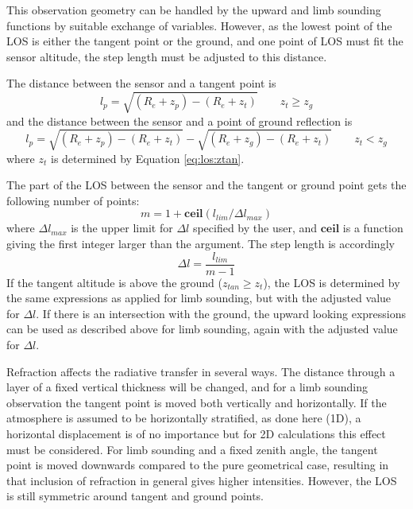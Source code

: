   \label{sec:los:down}
  
  This observation geometry can be handled by the upward and limb
  sounding functions by suitable exchange of variables. However, as
  the lowest point of the LOS is either the tangent point or the
  ground, and one point of LOS must fit the sensor altitude, the step
  length must be adjusted to this distance.

  The distance between the sensor and a tangent point is
  \begin{equation}
    l_p = \sqrt{ (R_e+z_p) - (R_e+z_t) } \qquad  z_t \geq z_g
  \end{equation}
  and the distance between the sensor and a point of ground
  reflection is
  \begin{equation}
    l_p = \sqrt{ (R_e+z_p) - (R_e+z_t) } - \sqrt{ (R_e+z_g) - (R_e+z_t) }
            \qquad z_t < z_g
  \end{equation}
  where $z_t$ is determined by Equation \ref{eq:los:ztan}.

 The part of the LOS between the sensor and the tangent or ground
 point gets the following number of points:
 \begin{equation}
    m = 1 + \mathbf{ ceil}(l_{lim}/\Delta l_{max})
  \label{eq:los:m}
 \end{equation}
 where $\Delta l_{max}$ is the upper limit for $\Delta l$ specified by
 the user, and $\mathbf{ ceil}$ is a function giving the first integer
 larger than the argument. The step length is accordingly
 \begin{equation}
    \Delta l = \frac{l_{lim}}{m-1}
  \label{eq:los:dl}
 \end{equation} 
 If the tangent altitude is above the ground ($z_{tan} \geq z_t$),
 the LOS is determined by the same expressions as applied for limb
 sounding, but with the adjusted value for $\Delta l$.
 If there is an intersection with the ground, the upward
 looking expressions can be used as described above for limb sounding,
 again with the adjusted value for $\Delta l$.


  \label{sec:los:refraction}
  
  Refraction affects the radiative transfer in several ways. The
  distance through a layer of a fixed vertical thickness will be
  changed, and for a limb sounding observation the tangent point is
  moved both vertically and horizontally. If the atmosphere is assumed
  to be horizontally stratified, as done here (1D), a horizontal
  displacement is of no importance but for 2D calculations this effect
  must be considered. For limb sounding and a fixed zenith angle, the
  tangent point is moved downwards compared to the pure geometrical
  case, resulting in that inclusion of refraction in general gives
  higher intensities. However, the LOS is still symmetric around
  tangent and ground points.

